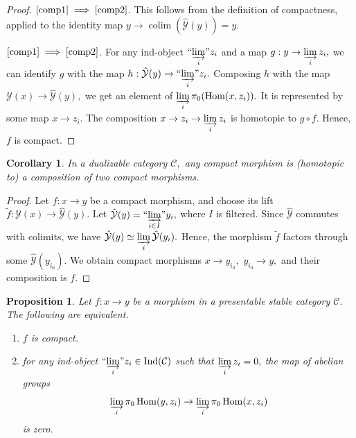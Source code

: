 \documentclass[11pt,leqno]{amsart}
\newcommand{\Implies}[2]{$\text{\ref{#1}}\implies\text{\ref{#2}}$}
\newtheorem{prop}[theo]{Proposition}
\newtheorem{cor}[theo]{Corollary}
\numberwithin{equation}{section}
\def\Hom{\operatorname{Hom}}
\DeclareMathOperator*{\colim}{colim}
\newcommand{\indlim}[1][]{\mathop{\varinjlim}\limits_{#1}}
\newcommand{\inddlim}[1][]{{``{\indlim[#1]}"}}
\newcommand{\cC}{{\mathcal C}}
\newcommand{\cY}{{\mathcal Y}}
\newcommand{\Ind}{\operatorname{Ind}}
\begin{document}
\begin{proof}\Implies{comp1}{comp2}. This follows from the definition of compactness, applied to the identity map $y\to\colim(\hat{\cY}(y))=y.$

\Implies{comp1}{comp2}. For any ind-object $\inddlim[i]z_i$ and a map $g:y\to\indlim[i]z_i,$ we can identify $g$ with the map $h:\hat{\cY}(y)\to\inddlim[i]z_i.$ Composing $h$ with the map $\cY(x)\to\hat{\cY}(y),$ we get an element of $\indlim[i]\pi_0(\Hom(x,z_i)).$ It is represented by some map $x\to z_i.$ The composition $x\to z_i\to\indlim[i]z_i$ is homotopic to $g\circ f.$ Hence, $f$ is compact.
\end{proof}

\begin{cor}\label{cor:decomposing_compact_morphisms} In a dualizable category $\cC,$ any compact morphism is (homotopic to) a composition of two compact morphisms.\end{cor}

\begin{proof} Let $f:x\to y$ be a compact morphism, and choose its lift $\tilde{f}:\cY(x)\to\hat{\cY}(y).$ Let $\hat{\cY}(y)=\inddlim[i\in I]y_i,$ where $I$ is filtered. Since $\hat{\cY}$ commutes with colimits, we have $\hat{\cY}(y)\simeq\indlim[i]\hat{\cY}(y_i).$ Hence, the morphism $\tilde{f}$ factors through some $\hat{\cY}(y_{i_0}).$ We obtain compact morphisms $x\to y_{i_0},$ $y_{i_0}\to y,$ and their composition is $f.$\end{proof}

\begin{prop}\label{prop:compactness_of_morphisms_definitions} Let $f:x\to y$ be a morphism in a presentable stable category $\cC.$ The following are equivalent.

\begin{enumerate}[label=(\roman*),ref=(\roman*)]
\item $f$ is compact. \label{compdef1}

\item for any ind-object $\inddlim[i]z_i\in\Ind(\cC)$ such that $\indlim[i]z_i=0,$ the map of abelian groups
$$\indlim[i]\pi_0\Hom(y,z_i)\to \indlim[i]\pi_0\Hom(x,z_i)$$
is zero. \label{compdef2}
\end{enumerate}
\end{prop}
\end{document}
